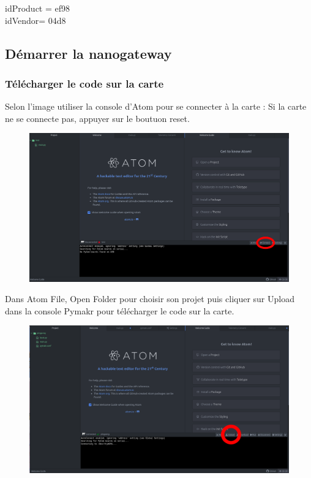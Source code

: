 \documentclass{article}
\begin{document}
idProduct = ef98\\
idVendor= 04d8\\




\subsection{Démarrer la nanogateway}

\subsubsection{Télécharger le code sur la carte}
Selon l'image utiliser la console d'Atom pour se connecter à la carte :
Si la carte ne se connecte pas, appuyer sur le boutuon reset.


  \begin{figure}[H]
\begin{center}
\advance\leftskip-3cm
\advance\rightskip-3cm
\includegraphics[keepaspectratio=true,scale=0.3]{atom_connect.png}
\label{visina8}
\end{center}\end{figure}

Dans Atom File, Open Folder pour choisir son projet puis cliquer sur Upload dans la console Pymakr pour télécharger le  code sur la carte.

\begin{figure}[H]
\begin{center}
\advance\leftskip-3cm
\advance\rightskip-3cm
\includegraphics[keepaspectratio=true,scale=0.3]{atom_upload.png}
\label{visina8}
\end{center}\end{figure}
\end{document}
